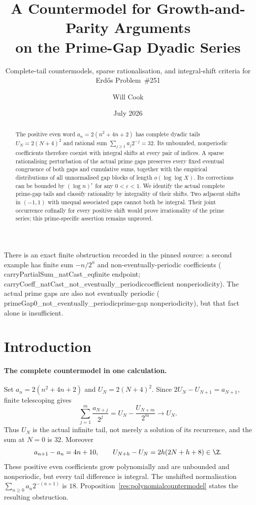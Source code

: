 \documentclass[11pt]{article}
\title{A Countermodel for Growth-and-Parity Arguments\\on the Prime-Gap Dyadic Series}
\subtitle{Complete-tail countermodels, sparse rationalisation,
and integral-shift criteria for Erd\H{o}s Problem~\#251}
\author{Will Cook}
\date{July 2026}
\begin{document}
\maketitle
\noteprovenance

\begin{abstract}
The positive even word $a_n=2(n^2+4n+2)$ has complete dyadic tails
$U_N=2(N+4)^2$ and rational sum $\sum_{j\ge1}a_j2^{-j}=32$.
Its unbounded, nonperiodic coefficients therefore coexist with integral
shifts at every pair of indices.  A sparse rationalising perturbation of the
actual prime gaps preserves every fixed eventual congruence of both gaps
and cumulative sums, together with the empirical distributions of all
unnormalised gap blocks of length $o(\log\log X)$.  Its corrections can be
bounded by $(\log n)^\varepsilon$ for any $0<\varepsilon<1$.
We identify the actual complete prime-gap tails and classify rationality by
integrality of their shifts.  Two adjacent shifts in $(-1,1)$ with unequal
associated gaps cannot both be integral.  Their joint occurrence cofinally
for every positive shift would prove irrationality of the prime series;
this prime-specific assertion remains unproved.
\end{abstract}

There is an exact finite obstruction recorded in the pinned source: a second
example has finite sum $-n/2^n$ and non-eventually-periodic coefficients
(
      {carryPartialSum_natCast_eq}{finite endpoint};
      {carryCoeff_natCast_not_eventually_periodic}{coefficient nonperiodicity}).
The actual prime gaps are also not eventually periodic
(
      {primeGap0_not_eventually_periodic}{prime-gap nonperiodicity}),
but that fact alone is insufficient.

\section{Introduction}\label{sec:problem}

\paragraph{The complete countermodel in one calculation.}
Set $a_n=2(n^2+4n+2)$ and $U_N=2(N+4)^2$.  Since
$2U_N-U_{N+1}=a_{N+1}$, finite telescoping gives
\[
 \sum_{j=1}^{m}\frac{a_{N+j}}{2^j}
   =U_N-\frac{U_{N+m}}{2^m}\longrightarrow U_N.
\]
Thus $U_N$ is the actual infinite tail, not merely a solution of its
recurrence, and the sum at $N=0$ is $32$.  Moreover
\[
 a_{n+1}-a_n=4n+10,\qquad
 U_{N+h}-U_N=2h(2N+h+8)\in\Z.
\]
These positive even coefficients grow polynomially and are unbounded and
nonperiodic, but every tail difference is integral.  The unshifted
normalisation $\sum_{n\ge0}a_n2^{-(n+1)}$ is $18$.
Proposition~\ref{res:polynomialcountermodel} states the resulting obstruction.
\end{document}
